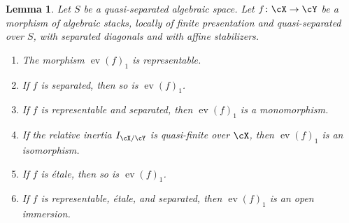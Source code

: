 \documentclass[a4paper]{amsart}
\numberwithin{equation}{section}
\theoremstyle{plain}
\newtheorem{lem}[thm]{Lemma}
\theoremstyle{definition}
\DeclareMathOperator{\ev}{ev}
\newcommand{\co}{\colon}
\begin{document}
\begin{lem} \label{L:basic}
Let $S$ be a quasi-separated algebraic space.
Let $f \co \cX \to \cY$ be a morphism of algebraic stacks, locally of finite presentation {and quasi-separated} over $S$, with separated diagonals and with affine stabilizers. 
\begin{enumerate} 
	\item The morphism $\ev(f)_1$ is representable. 
		 \label{L:basic-representable}
	\item If $f$ is separated, then so is $\ev(f)_1$.
		\label{L:basic-separated}
	\item  If $f$ is representable and separated, then $\ev(f)_1$ is a monomorphism.
		\label{L:basic-monomorphism}
	\item If {the relative inertia $I_{\cX/\cY}$ is quasi-finite over $\cX$}, then $\ev(f)_1$ is an isomorphism.
		\label{L:basic-isomorphism}
	\item If $f$ is \'etale, then so is $\ev(f)_1$.
		\label{L:basic-etale}	
	\item If $f$ is representable, \'etale, and separated, then $\ev(f)_1$ is an open immersion.
		\label{L:basic-open-immersion}
\end{enumerate}
\end{lem}
\end{document}
